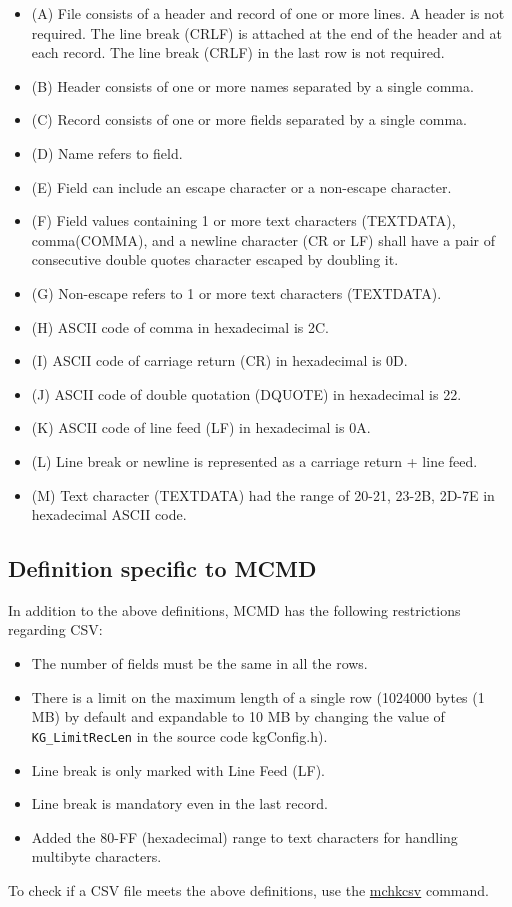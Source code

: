 \begin{itemize}
\item (A) File consists of a header and record of one or more lines. A header is not required. The line break (CRLF) is attached at the end of the header and at each record. The line break (CRLF) in the last row is not required.
\item (B) Header consists of one or more names separated by a single comma.
\item (C) Record consists of one or more fields separated by a single comma.
\item (D) Name refers to field.
\item (E) Field can include an escape character or a non-escape character.
\item (F) Field values containing 1 or more text characters (TEXTDATA), comma(COMMA), and a newline character (CR or LF) shall have a pair of consecutive double quotes character escaped by doubling it.
\item (G) Non-escape refers to 1 or more text characters (TEXTDATA).
\item (H) ASCII code of comma in hexadecimal is 2C.
\item (I) ASCII code of carriage return (CR) in hexadecimal is 0D.
\item (J) ASCII code of double quotation (DQUOTE) in hexadecimal is 22.
\item (K) ASCII code of line feed (LF) in hexadecimal is 0A.
\item (L) Line break or newline is represented as a carriage return + line feed.
\item (M) Text character (TEXTDATA) had the range of 20-21, 23-2B, 2D-7E in hexadecimal ASCII code.
\end{itemize}

\subsection{Definition specific to MCMD}
In addition to the above definitions, MCMD has the following restrictions regarding CSV:

\begin{itemize}
\item The number of fields must be the same in all the rows.
\item There is a limit on the maximum length of a single row (1024000 bytes (1 MB) by default and expandable to 10 MB by changing the value of \verb|KG_LimitRecLen| in the source code kgConfig.h).
\item Line break is only marked with Line Feed (LF).
\item Line break is mandatory even in the last record.
\item Added the 80-FF (hexadecimal) range to text characters for handling multibyte characters.
\end{itemize}
To check if a CSV file meets the above definitions, use the \hyperref[sect:mchkcsv]{mchkcsv} command.

